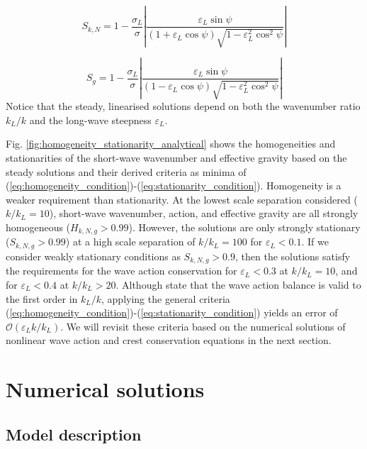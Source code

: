 \documentclass[lineno]{jfm}
\begin{document}
\begin{equation}
  S_{k,N} = 1 - \frac{\sigma_L}{\sigma} \left| \frac{\varepsilon_L \sin{\psi}}{\left(1 + \varepsilon_L \cos{\psi}\right) \sqrt{1 - \varepsilon_L^2 \cos^2{\psi}}} \right|
  \label{eq:stationarity_k}
\end{equation}

\begin{equation}
  S_{g} = 1 - \frac{\sigma_L}{\sigma} \left| \frac{\varepsilon_L \sin{\psi}}{\left(1 - \varepsilon_L \cos{\psi}\right) \sqrt{1 - \varepsilon_L^2 \cos^2{\psi}}} \right|
  \label{eq:stationarity_g}
\end{equation}
Notice that the steady, linearised solutions depend on both the wavenumber
ratio $k_L/k$ and the long-wave steepness $\varepsilon_L$.

Fig. \ref{fig:homogeneity_stationarity_analytical} shows the homogeneities and
stationarities of the short-wave wavenumber and effective gravity based on
the steady solutions and their derived criteria as minima of
(\ref{eq:homogeneity_condition})-(\ref{eq:stationarity_condition}).
Homogeneity is a weaker requirement than stationarity.
At the lowest scale separation considered ($k/k_L = 10$), short-wave wavenumber,
action, and effective gravity are all strongly homogeneous ($H_{k,N,g} > 0.99$).
However, the solutions are only strongly stationary ($S_{k,N,g} > 0.99$) at a
high scale separation of $k/k_L = 100$ for $\varepsilon_L < 0.1$.
If we consider weakly stationary conditions as $S_{k,N,g} > 0.9$, then the
solutions satisfy the requirements for the wave action conservation for
$\varepsilon_L < 0.3$ at $k/k_L = 10$, and for $\varepsilon_L < 0.4$ at
$k/k_L > 20$.
Although \citet{bretherton1968wavetrains} state that the wave action balance
is valid to the first order in $k_L/k$, applying the general criteria
(\ref{eq:homogeneity_condition})-(\ref{eq:stationarity_condition}) yields an
error of $\mathcal{O}(\varepsilon_L k/k_L)$.
We will revisit these criteria based on the numerical solutions of nonlinear
wave action and crest conservation equations in the next section.

\section{Numerical solutions}
\label{section:numerical_solutions}

\subsection{Model description}
\end{document}
